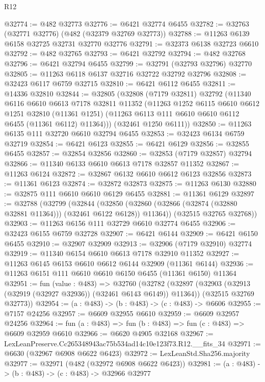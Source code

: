 \begin{lexlean}{R12}
\begin{coremodule}
@32774 := @482 @32773
@32776 := @6421 @32774 @6455
@32782 := @32763 (@32771 @32776) (@482 (@32379 @32769 @32773))
@32788 := @11263 @6139 @6158 @32725 @32731 @32770 @32776
@32791 := @32373 @6138 @32723 @6610
@32792 := @482 @32765
@32793 := @6421 @32792
@32794 := @482 @32768
@32796 := @6421 @32794 @6455
@32799 := @32791 (@32793 @32796) @32770
@32805 := @11263 @6118 @6137 @32716 @32722 @32792 @32796
@32808 := @32423 @6117 @6759 @32715
@32810 := @6421 @6112 @6455
@32811 := @14336 @32810
@32844 := @32805
    (@32808
      (@7179 @32811)
      @32792
      (@11340
        @6116
        @6610
        @6613
        @7178
        @32811
        @11352
        (@11263
          @1252
          @6115
          @6610
          @6612
          @1251
          @32810
          (@11361 @1251)
          (@11263 @6113 @111 @6610 @6610 @6112 @6455 (@11361 @6112) @11364)))
      (@32461 @1250 @6111))
@32850 := @11263 @6135 @111 @32720 @6610 @32794 @6455
@32853 := @32423 @6134 @6759 @32719
@32854 := @6421 @6123
@32855 := @6421 @6129
@32856 := @32855 @6455
@32857 := @32854 @32856
@32860 := @32853 (@7179 @32857) @32794
@32866 := @11340 @6133 @6610 @6613 @7178 @32857 @11352
@32867 := @11263 @6124
@32872 := @32867 @6132 @6610 @6612 @6123 @32856
@32873 := @11361 @6123
@32874 := @32872 @32873
@32875 := @11263 @6130
@32880 := @32875 @111 @6610 @6610 @6129 @6455
@32881 := @11361 @6129
@32897 := @32788
    (@32799
      (@32844
        (@32850 (@32860 (@32866 (@32874 (@32880 @32881 @11364))) (@32461 @6122 @6128)) @11364))
      (@32515 @32765 @32768))
@32903 := @11263 @6156 @111 @32729 @6610 @32774 @6455
@32906 := @32423 @6155 @6759 @32728
@32907 := @6421 @6144
@32909 := @6421 @6150 @6455
@32910 := @32907 @32909
@32913 := @32906 (@7179 @32910) @32774
@32919 := @11340 @6154 @6610 @6613 @7178 @32910 @11352
@32927 := @11263 @6145 @6153 @6610 @6612 @6144 @32909 (@11361 @6144)
@32936 := @11263 @6151 @111 @6610 @6610 @6150 @6455 (@11361 @6150) @11364
@32951 := fun (value : @483) =>
  @32760
    (@32782
      (@32897 (@32903 (@32913 (@32919 (@32927 @32936)) (@32461 @6143 @6149)) @11364))
      (@32515 @32769 @32773))
@32954 := (a : @483) -> (b : @483) -> (c : @483) -> @6606
@32955 := @7157 @24256
@32957 := @6609 @32955 @6610
@32959 := @6609 @32957 @24256
@32964 := fun (a : @483) => fun (b : @483) => fun (c : @483) => @6609 @32959 @6610
@32966 := @6620 @4905 @32168
@32967 := LexLeanPreserve.Cc265348943ac75b534ad14c10e123f73.R12.__fits_34
@32971 := @6630 (@32967 @6908 @6622 @6423)
@32972 := LexLeanStd.Sha256.majority
@32977 := @32971 (@482 (@32972 @6908 @6622 @6423))
@32981 := (a : @483) -> (b : @483) -> (c : @483) -> @32966 @32977

\end{coremodule}
\end{lexlean}
